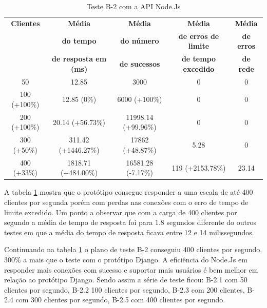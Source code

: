   \begin{table}[H]
    \centering
    \footnotesize
    \setlength{\abovecaptionskip}{0pt}
    \setlength{\belowcaptionskip}{0pt}
    \caption[Teste B-2 com a API Node.Js]{Teste B-2 com a API Node.Js}
    \label{tab:teste-b-2}
    \begin{tabular}{c|c|c|c|c}
      \hline \hline
      \textbf{Clientes} & \textbf{Média} &	\textbf{Média} & \textbf{Média} & \textbf{Média}  \\
      {}		& \textbf{do tempo} &   \textbf{do número } & \textbf{de erros de limite} & \textbf{de erros}  \\
      {}		& \textbf{de resposta em (ms) } &\textbf{de sucessos } & \textbf{de tempo excedido} & \textbf{de rede} \\
      \hline \hline
      50 &			12.85		 & 		3000 &					0 &					0 \\
      100 (+100\%)&		12.85 (0\%) & 			6000 (+100\%) & 			0 &					0 \\
      200 (+100\%)&		20.14 (+56.73\%) & 		11998.14 (+99.96\%) & 			0 &					0 \\
      300 (+50\%)&		311.42 (+1446.27\%) & 		17862 (+48.87\%) & 			5.28 &					0 \\
      400 (+33\%)&		1818.71 (+484.00\%) & 		16581.28 (-7.17\%) & 			119 (+2153.78\%) &			23.14 \\
      \hline \hline
    \end{tabular}
  \end{table}

  A tabela \ref{tab:teste-b-2} mostra que o protótipo consegue responder a uma escala de até 400 clientes por segunda
  porém com perdas nas conexões com o erro de tempo de limite excedido. Um ponto a observar que com a carga de 400 clientes por segundo
  a média de tempo de resposta foi para 1.8 segundos diferente do outros testes em que a média do tempo de resposta ficava entre 12 e 14
  milissegundos.

  Continuando na tabela \ref{tab:teste-b-2} o plano de teste B-2 conseguiu 400 clientes por segundo, 300\% a mais que o teste
  com o protótipo Django. A eficiência do Node.Js em responder mais conexões com sucesso e suportar
  mais usuários é bem melhor em relação ao protótipo Django. Sendo assim a série de teste ficou: B-2.1 com 50 clientes por segundo,
  B-2.2 100 clientes por segundo,  B-2.3 com 200 clientes, B-2.4 com 300 clientes por segundo, B-2.5 com 400 clientes por segundo.


